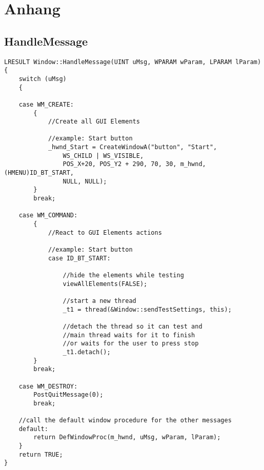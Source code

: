 

\chapter{Anhang}
\section{HandleMessage}\label{HandleMessageCode}
		
\begin{lstlisting}	
LRESULT Window::HandleMessage(UINT uMsg, WPARAM wParam, LPARAM lParam)
{
    switch (uMsg)
    {

    case WM_CREATE:
        {
            //Create all GUI Elements
            
            //example: Start button
            _hwnd_Start = CreateWindowA("button", "Start",
				WS_CHILD | WS_VISIBLE,
				POS_X+20, POS_Y2 + 290, 70, 30, m_hwnd, (HMENU)ID_BT_START,
				NULL, NULL);
        }
        break;
        
    case WM_COMMAND:
        {
            //React to GUI Elements actions
            
            //example: Start button
            case ID_BT_START:

				//hide the elements while testing
				viewAllElements(FALSE);

				//start a new thread
				_t1 = thread(&Window::sendTestSettings, this);
				
				//detach the thread so it can test and
				//main thread waits for it to finish
				//or waits for the user to press stop
				_t1.detach();
        }
        break;
        
    case WM_DESTROY:
        PostQuitMessage(0);
        break;

	//call the default window procedure for the other messages
    default:
        return DefWindowProc(m_hwnd, uMsg, wParam, lParam);
    }
    return TRUE;
}

\end{lstlisting}


